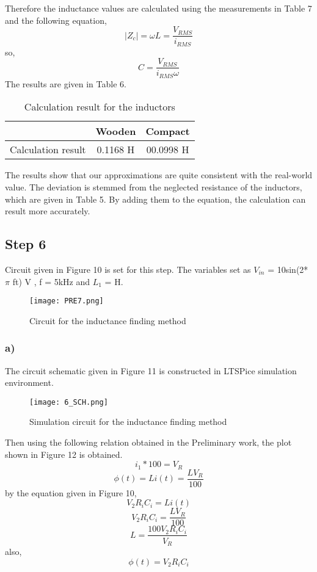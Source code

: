 \documentclass[letterpaper,12pt]{article}
\begin{document}
Therefore the inductance values are calculated using the measurements in Table 7 and the following equation,
\[|Z_c| = \omega L = \frac{V_{RMS}}{i_{RMS}}\]
so,
\[C = \frac{V_{RMS} }{i_{RMS} \omega}
	\]
The results are given in Table 6.
\begin{table}[H]
	\begin{center}
		\caption{Calculation result for the inductors}
		\vspace{2mm}
		\begin{tabular}{||c | c | c||} 
		 \hline
		   & Wooden & Compact \\ [0.5ex] 
		 \hline\hline
		Calculation result & 0.1168 H & 00.0998 H \\
		 \hline
		\end{tabular}
\end{center}
\end{table}
The results show that our approximations are quite consistent with the real-world value. The deviation is stemmed from the neglected resistance of the inductors, which are given in Table 5. By adding them to the equation, the calculation can result more accurately.
\subsection{Step 6}
Circuit given in Figure 10 is set for this step. The variables set as \(V_{in}\) = 10sin(2*\(\pi\) ft) V , f = 5kHz and \(L_1\) = H.
\begin{figure}[H]
	\centering
   \texttt{[image: PRE7.png]}
   \caption{Circuit for the inductance finding method}
\end{figure}

\subsubsection{a)}
The circuit schematic given in Figure 11 is constructed in LTSPice simulation environment.
\begin{figure}[H]
	\centering
   \texttt{[image: 6\_SCH.png]}
   \caption{Simulation circuit for the inductance finding method}
\end{figure}
Then using the following relation obtained in the Preliminary work, the plot shown in Figure 12 is obtained.
\[
i_1*100 = V_R
\]
\[
	\phi(t) = L i(t) = \frac{L V_R}{100}
\]
by the equation given in Figure 10,
\[V_2 R_i C_i = L i(t)\]
\[V_2 R_i C_i = \frac{L V_R}{100}\]
\[L = \frac{100 V_2 R_i C_i}{V_R}\]
also,
\[\phi(t) = V_2 R_i C_i\]
\end{document}
